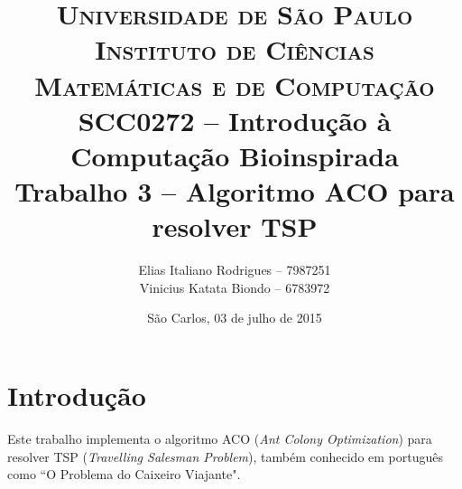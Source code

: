\documentclass[a4paper, twoside, 12pt]{article}
\begin{document}
\setlength\parskip{0.3cm}


\begin{titlepage}

		\title{
\textsc {\large{Universidade de São Paulo\\
Instituto de Ciências Matemáticas e de Computação}}\\[1cm]
\large{SCC0272 -- Introdução à Computação Bioinspirada}\\[6cm]
\LARGE{Trabalho 3 -- Algoritmo ACO para resolver TSP}\\[5.5cm]
		}

		\author{
Elias Italiano Rodrigues -- 7987251\\
Vinicius Katata Biondo -- 6783972
		}

		\date{
\vfill São Carlos, 03 de julho de 2015
		}

		\maketitle
		\thispagestyle{empty}

\end{titlepage}
	
\setcounter{page}{1}


\tableofcontents

\clearpage


\section{Introdução \label{sec:introducao}}

Este trabalho implementa o algoritmo ACO (\textit{Ant Colony Optimization}) para resolver TSP (\textit{Travelling Salesman Problem}), também conhecido em português como ``O Problema do Caixeiro Viajante".
\end{document}
